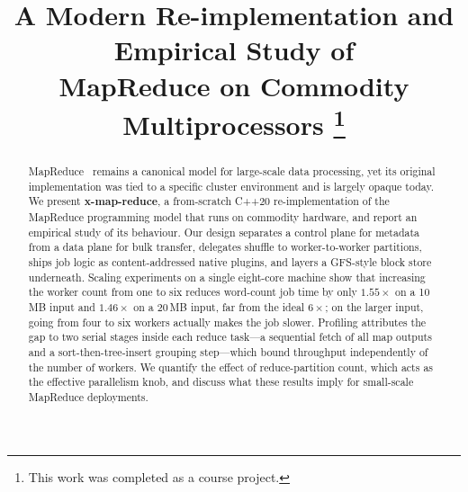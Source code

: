 \documentclass[conference]{IEEEtran}
\begin{document}
\title{A Modern Re-implementation and Empirical Study of\\
MapReduce on Commodity Multiprocessors
\thanks{This work was completed as a course project.}}

\author{
\and
{}
\and
{}
\and
{}
}

\maketitle

\begin{abstract}
MapReduce~\cite{dean2004mapreduce} remains a canonical model for large-scale
data processing, yet its original implementation was tied to a specific
cluster environment and is largely opaque today. We present
\textbf{x-map-reduce}, a from-scratch C++20 re-implementation of the
MapReduce programming model that runs on commodity hardware, and report an
empirical study of its behaviour. Our design separates a control plane for
metadata from a data plane for bulk transfer, delegates shuffle to
worker-to-worker partitions, ships job logic as content-addressed native
plugins, and layers a GFS-style block store underneath.
Scaling experiments on a single eight-core machine show that increasing the
worker count from one to six reduces word-count job time by only
$1.55\times$ on a 10\,MB input and $1.46\times$ on a 20\,MB input, far from
the ideal $6\times$; on the larger input, going from four to six workers
actually makes the job slower.
Profiling attributes the gap to two serial stages inside each reduce task---a
sequential fetch of all map outputs and a sort-then-tree-insert grouping
step---which bound throughput independently of the number of workers. We
quantify the effect of reduce-partition count, which acts as the effective
parallelism knob, and discuss what these results imply for small-scale
MapReduce deployments.
\end{abstract}
\end{document}
